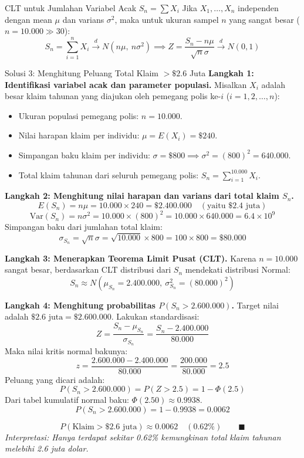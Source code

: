 \documentclass[10pt,twoside]{article}
\begin{document}
\begin{tipbox}{CLT untuk Jumlahan Variabel Acak $S_n = \sum X_i$}
Jika $X_1, \dots, X_n$ independen dengan mean $\mu$ dan varians $\sigma^2$, maka untuk ukuran sampel $n$ yang sangat besar ($n = 10.000 \gg 30$):
\[
S_n = \sum_{i=1}^n X_i \xrightarrow{d} N(n\mu, \ n\sigma^2) \implies Z = \frac{S_n - n\mu}{\sqrt{n}\sigma} \xrightarrow{d} N(0, 1)
\]
\end{tipbox}

\begin{solbox}{Solusi 3: Menghitung Peluang Total Klaim $> \$2.6$ Juta}
\textbf{Langkah 1: Identifikasi variabel acak dan parameter populasi.}
Misalkan $X_i$ adalah besar klaim tahunan yang diajukan oleh pemegang polis ke-$i$ ($i = 1, 2, \dots, n$):
\begin{itemize}
  \item Ukuran populasi pemegang polis: $n = 10.000$.
  \item Nilai harapan klaim per individu: $\mu = E(X_i) = \$240$.
  \item Simpangan baku klaim per individu: $\sigma = \$800 \implies \sigma^2 = (800)^2 = 640.000$.
  \item Total klaim tahunan dari seluruh pemegang polis: $S_n = \sum_{i=1}^{10.000} X_i$.
\end{itemize}

\textbf{Langkah 2: Menghitung nilai harapan dan varians dari total klaim $S_n$.}
\[
E(S_n) = n\mu = 10.000 \times 240 = \$2.400.000 \quad (\text{yaitu } \$2.4 \text{ juta})
\]
\[
\mathrm{Var}(S_n) = n\sigma^2 = 10.000 \times (800)^2 = 10.000 \times 640.000 = 6.4 \times 10^9
\]
Simpangan baku dari jumlahan total klaim:
\[
\sigma_{S_n} = \sqrt{n}\sigma = \sqrt{10.000} \times 800 = 100 \times 800 = \$80.000
\]

\textbf{Langkah 3: Menerapkan Teorema Limit Pusat (CLT).}
Karena $n = 10.000$ sangat besar, berdasarkan CLT distribusi dari $S_n$ mendekati distribusi Normal:
\[
S_n \approx N(\mu_{S_n} = 2.400.000, \ \sigma_{S_n}^2 = (80.000)^2)
\]

\textbf{Langkah 4: Menghitung probabilitas $P(S_n > 2.600.000)$.}
Target nilai adalah $\$2.6 \text{ juta} = \$2.600.000$. Lakukan standardisasi:
\[
Z = \frac{S_n - \mu_{S_n}}{\sigma_{S_n}} = \frac{S_n - 2.400.000}{80.000}
\]
Maka nilai kritis normal bakunya:
\[
z = \frac{2.600.000 - 2.400.000}{80.000} = \frac{200.000}{80.000} = 2.5
\]
Peluang yang dicari adalah:
\[
P(S_n > 2.600.000) = P(Z > 2.5) = 1 - \Phi(2.5)
\]
Dari tabel kumulatif normal baku: $\Phi(2.50) \approx 0.9938$.
\[
P(S_n > 2.600.000) = 1 - 0.9938 = 0.0062
\]

\[
\boxed{P(\text{Klaim} > \$2.6 \text{ juta}) \approx 0.0062 \quad (0.62\%)} \qquad \blacksquare
\]
\textit{Interpretasi: Hanya terdapat sekitar 0.62\% kemungkinan total klaim tahunan melebihi 2.6 juta dolar.}
\end{solbox}
\end{document}
